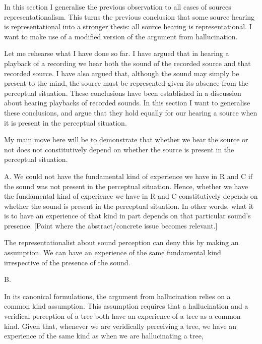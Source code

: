 \documentclass[sloppy, journal, git, bytitle, dodraft]{humapap}
\begin{document}

\sect In this section I generalise the previous observation to all cases of sources representationalism. This turns the previous conclusion that some source hearing is representational into a stronger thesis: all source hearing is representational. I want to make use of a modified version of the argument from hallucination. 

Let me rehearse what I have done so far. I have argued that in hearing a playback of a recording we hear both the sound of the recorded source and that recorded source. I have also argued that, although the sound may simply be present to the mind, the source must be represented given its absence from the perceptual situation. These conclusions have been established in a discussion about hearing playbacks of recorded sounds. In this section I want to generalise these conclusions, and argue that they hold equally for our hearing a source when it is present in the perceptual situation. 

My main move here will be to demonstrate that whether we hear the source or not does not constitutively depend on whether the source is present in the perceptual situation. 

A. We could not have the fundamental kind of experience we have in R and C if the sound was not present in the perceptual situation. Hence, whether we have the fundamental kind of experience we have in R and C constitutively depends on whether the sound is present in the perceptual situation. In other words, what it is to have an experience of that kind in part depends on that particular sound's presence. [Point where the abstract/concrete issue becomes relevant.]

The representationalist about sound perception can deny this by making an assumption. We can have an experience of the same fundamental kind irrespective of the presence of the sound. 

B. 



In its canonical formulations, the argument from hallucination relies on a common kind assumption. This assumption requires that a hallucination and a veridical perception of a tree both have an experience of a tree as a common kind. Given that, whenever we are veridically perceiving a tree, we have an experience of the same kind as when we are hallucinating a tree,
\end{document}

